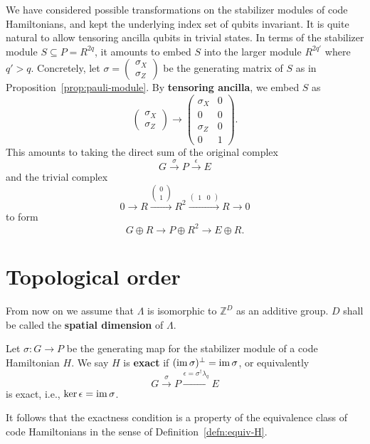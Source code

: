 We have considered possible transformations
on the stabilizer modules of code Hamiltonians,
and kept the underlying index set of qubits invariant.
It is quite natural to allow tensoring ancilla qubits in trivial states.
In terms of the stabilizer module $S \subseteq P=R^{2q}$,
it amounts to embed $S$ into the larger module $R^{2q'}$ where $q' > q$.
Concretely,
let $\sigma = \begin{pmatrix} \sigma_X \\ \sigma_Z \end{pmatrix}$
be the generating matrix of $S$ as in Proposition~\ref{prop:pauli-module}.
By {\bf tensoring ancilla}, we embed $S$ as
\[
\begin{pmatrix} \sigma_X \\ \sigma_Z \end{pmatrix}
 \to 
\begin{pmatrix}
 \sigma_X & 0 \\
 0        & 0 \\
 \sigma_Z & 0 \\
 0        & 1
\end{pmatrix} .
\]
This amounts to taking the direct sum of the original complex
\[
 G \xrightarrow{\sigma} P \xrightarrow{\epsilon} E
\]
and the trivial complex
\[
0
\to
 R
 \xrightarrow{ \begin{pmatrix} 0 \\ 1 \end{pmatrix} }
 R^2
 \xrightarrow{ \begin{pmatrix} 1 & 0 \end{pmatrix} }
 R
\to 0
\]
to form
\[
  G \oplus R \xrightarrow{} P \oplus R^2 \xrightarrow{} E \oplus R .
\]


\section{Topological order}
\label{sec:topological-order}
From now on we assume that $\Lambda$ is isomorphic to $\mathbb{Z}^D$ as an additive group.
$D$ shall be called the {\bf spatial dimension} of $\Lambda$.

\begin{defn}
Let $\sigma: G \to P$ be the generating map for the stabilizer module of
a code Hamiltonian $H$. We say $H$ is {\bf exact}
if $(\mathop{\mathrm{im}}\nolimits \sigma )^\perp = \mathop{\mathrm{im}}\nolimits \sigma$, or equivalently
\[
 G \xrightarrow{\sigma} P \xrightarrow{\epsilon=\sigma^\dagger \lambda_q} E
\]
is exact, i.e., $\ker \epsilon = \mathop{\mathrm{im}}\nolimits \sigma$.
\end{defn}
\noindent It follows that the exactness condition is
a property of the equivalence class of code Hamiltonians in the sense of Definition~\ref{defn:equiv-H}.

